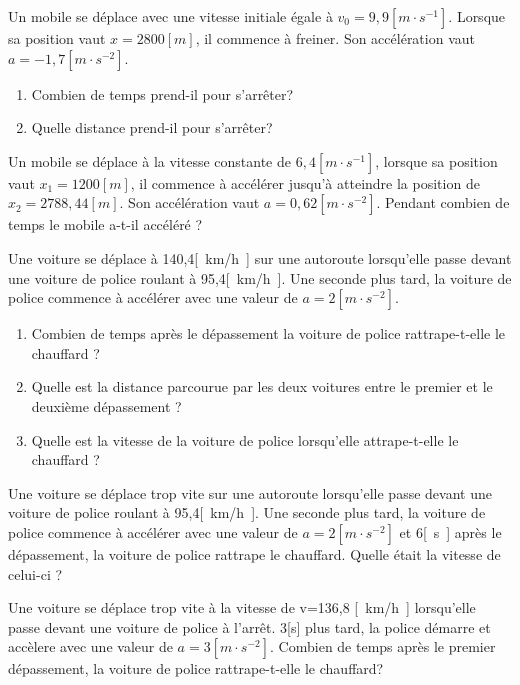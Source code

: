\begin{exercise}
  Un mobile se déplace avec une vitesse initiale égale à \(v_0=9,9[m \cdot s^{-1}]\). Lorsque sa position vaut \(x=2800[m]\), il commence à freiner. Son accélération vaut \(a=-1,7[m \cdot s^{-2}]\).
  \begin{enumerate}[label=\alph*)]
    \item Combien de temps prend-il pour s'arrêter?
    \item Quelle distance prend-il pour s'arrêter?
  \end{enumerate}
\end{exercise}

\begin{exercise}
  Un mobile se déplace à la vitesse constante de \(6,4[m \cdot s^{-1}]\), lorsque sa position vaut \(x_1=1200[m]\), il commence à accélérer jusqu'à atteindre la position de \(x_2=2788,44[m]\). Son accélération vaut \(a=0,62\unit{[m \cdot s^{-2}]}\).
  Pendant combien de temps le mobile a-t-il accéléré ?
\end{exercise}

\begin{exercise}[difficulty=**]
  Une voiture se déplace à 140,4\unit{[km/h]} sur une autoroute lorsqu'elle passe devant une voiture de police roulant à 95,4\unit{[km/h]}. Une seconde plus tard, la voiture de police commence à accélérer avec une valeur de \(a=2\unit{[m \cdot s^{-2}]}\).
  \begin{enumerate}[label=\alph*)]
    \item Combien de temps après le dépassement la voiture de police rattrape-t-elle le chauffard ?
    \item Quelle est la distance parcourue par les deux voitures entre le premier et le deuxième dépassement ?
    \item Quelle est la vitesse de la voiture de police lorsqu'elle attrape-t-elle le chauffard ?
  \end{enumerate}
\end{exercise}

\begin{exercise}[difficulty=**]
  Une voiture se déplace trop vite sur une autoroute lorsqu'elle passe devant une voiture de police roulant à 95,4\unit{[km/h]}. Une seconde plus tard, la voiture de police commence à accélérer avec une valeur de \(a=2\unit{[m \cdot s^{-2}]}\) et 6\unit{[s]} après le dépassement, la voiture de police rattrape le chauffard.
  Quelle était la vitesse de celui-ci ?
\end{exercise}

\begin{exercise}[difficulty=***]
  Une voiture se déplace trop vite à la vitesse de v=136,8 \unit{[km/h]} lorsqu'elle passe devant une voiture de police à l'arrêt. 3[s] plus tard, la police démarre et accèlere avec une valeur de \(a=3\unit{[m \cdot s^{-2}]}\). Combien de temps après le premier dépassement, la voiture de police rattrape-t-elle le chauffard?
\end{exercise}
